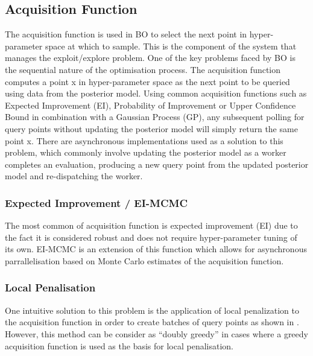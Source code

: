 	\subsection {Acquisition Function}

		The acquisition function is used in BO to select the next point in hyper-parameter space at which to sample. This is the component of the system that manages the exploit/explore problem. One of the key problems faced by BO is the sequential nature of the optimisation process. The acquisition function computes a point x in hyper-parameter space as the next point to be queried using data from the posterior model. Using common acquisition functions such as Expected Improvement (EI), Probability of Improvement or Upper Confidence Bound in combination with a Gaussian Process (GP), any subsequent polling for query points without updating the posterior model will simply return the same point x.
		There are asynchronous implementations used as a solution to this problem, which commonly involve updating the posterior model as a worker completes an evaluation, producing a new query point from the updated posterior model and re-dispatching the worker. \cite{26}\cite{27}\cite{20}



		\subsubsection{Expected Improvement / EI-MCMC}

			The most common of acquisition function is expected improvement (EI) due to the fact it is considered robust and does not require hyper-parameter tuning of its own. \cite{17} EI-MCMC is an extension of this function which allows for asynchronous parrallelisation based on Monte Carlo estimates of the acquisition function.



		\subsubsection{Local Penalisation}

			One intuitive solution to this problem is the application of local penalization to the acquisition function in order to create batches of query points as shown in \cite{37}. However, this method can be consider as “doubly greedy” \cite{36} in cases where a greedy acquisition function is used as the basis for local penalisation.




